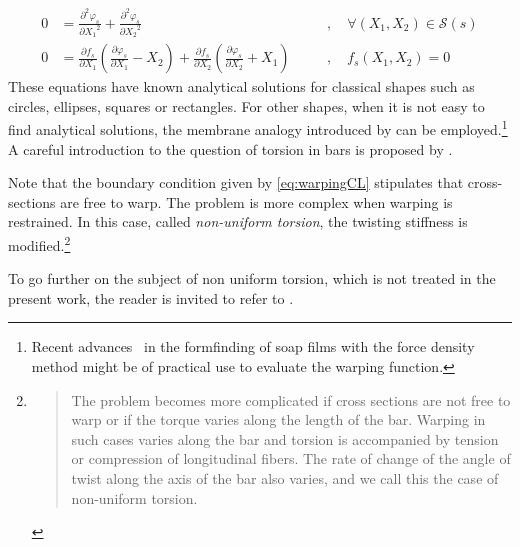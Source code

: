 \begin{subequations}
	\begin{alignat}{5}
	0 &= \frac{\partial^2 \varphi_s}{\partial {X_1}^2} + \frac{\partial^2 \varphi_s}{\partial {X_2}^2}
	&&  \quad, \quad \forall (X_1,X_2)\in\mathcal{S}(s)
	\\[0.5em]
	0 &= \frac{\partial f_s}{\partial {X_1}}\left(\frac{\partial \varphi_s}{\partial {X_1}} - X_2 \right) 
	+ \frac{\partial f_s}{\partial {X_2}}\left(\frac{\partial \varphi_s}{\partial {X_2}} + X_1 \right)
	&& \quad, \quad f_s(X_1,X_2) = 0 \label{eq:warpingCL}
	\end{alignat}
\end{subequations}
These equations have known analytical solutions for classical shapes such as circles, ellipses, squares or rectangles. For other shapes, when it is not easy to find analytical solutions, the membrane analogy introduced by  can be employed.\footnote{Recent advances~\cite{Koohestani2014} in the formfinding of soap films with the force density method might be of practical use to evaluate the warping function.} A careful introduction to the question of torsion in bars is proposed by .

Note that the boundary condition given by \cref{eq:warpingCL} stipulates that cross-sections are free to warp. The problem is more complex when warping is restrained. In this case, called \emph{non-uniform torsion}, the twisting stiffness is modified.\footnote{\blockcquote{Timoshenko1945b}{The problem becomes more complicated if cross sections are not free to warp or if the torque varies along the length of the bar. Warping in such cases varies along the bar and torsion is accompanied by tension or compression of longitudinal fibers. The rate of change of the angle of twist along the axis of the bar also varies, and we call this the case of non-uniform torsion.}.}

To go further on the subject of non uniform torsion, which is not treated in the present work, the reader is invited to refer to \cite{Vlasov1961,Elter1984,Alves2014}.

